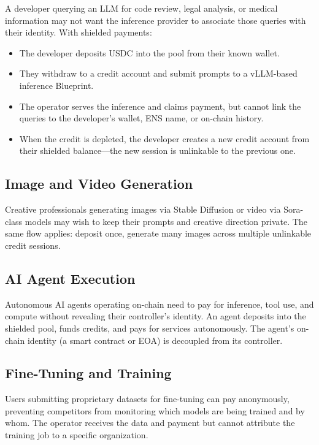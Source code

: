 \documentclass[11pt,a4paper]{article}
\theoremstyle{definition}
\begin{document}
A developer querying an LLM for code review, legal analysis, or medical information may not want the inference provider to associate those queries with their identity. With shielded payments:
\begin{itemize}[nosep]
  \item The developer deposits USDC into the pool from their known wallet.
  \item They withdraw to a credit account and submit prompts to a vLLM-based inference Blueprint.
  \item The operator serves the inference and claims payment, but cannot link the queries to the developer's wallet, ENS name, or on-chain history.
  \item When the credit is depleted, the developer creates a new credit account from their shielded balance---the new session is unlinkable to the previous one.
\end{itemize}

\subsection{Image and Video Generation}

Creative professionals generating images via Stable Diffusion or video via Sora-class models may wish to keep their prompts and creative direction private. The same flow applies: deposit once, generate many images across multiple unlinkable credit sessions.

\subsection{AI Agent Execution}

Autonomous AI agents operating on-chain need to pay for inference, tool use, and compute without revealing their controller's identity. An agent deposits into the shielded pool, funds credits, and pays for services autonomously. The agent's on-chain identity (a smart contract or EOA) is decoupled from its controller.

\subsection{Fine-Tuning and Training}

Users submitting proprietary datasets for fine-tuning can pay anonymously, preventing competitors from monitoring which models are being trained and by whom. The operator receives the data and payment but cannot attribute the training job to a specific organization.
\end{document}
